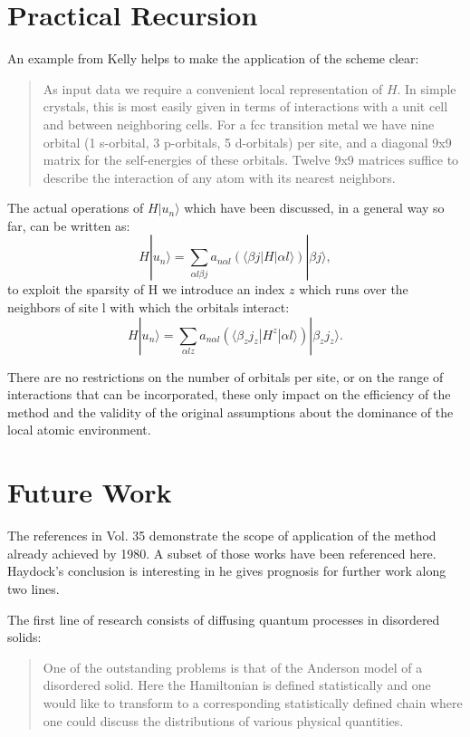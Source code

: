 \documentclass{article}
\def\ket{\rangle}
\def\bra{\langle}
\begin{document}
\section{Practical Recursion}
An example from Kelly helps to make the application of the scheme clear:
%
\begin{quote}
As input data we require a convenient local representation of $H$. In simple crystals,
this is most easily given in terms of interactions with a unit cell and between neighboring cells.
For a fcc transition metal we have nine orbital (1 s-orbital, 3 p-orbitals, 5 d-orbitals) per site, and a diagonal 9x9 matrix
for the self-energies of these orbitals. Twelve 9x9 matrices suffice to describe the interaction 
of any atom with its nearest neighbors.
\end{quote}
%

The actual operations of $H|u_{n}\ket$ which have been discussed, in a general way so far, 
can be written as:
%
\begin{equation}
H|u_{n}\ket = \sum_{\alpha l \beta j}a_{n \alpha l}(\bra \beta j |H| \alpha l\ket)|\beta j\ket,
\end{equation}
%
to exploit the sparsity of H we introduce an index $z$ which runs over the neighbors of 
site l with which the orbitals interact:
\begin{equation}
H|u_{n}\ket = \sum_{\alpha l z}a_{n \alpha l}(\bra \beta_{z} j_{z} |H^{z}|\alpha l\ket)|\beta_{z} j_{z}\ket.
\end{equation}

There are no restrictions on the number of orbitals per site, or on the range of interactions that can be
incorporated, these only impact on the efficiency of the method and the validity of the original assumptions
about the dominance of the local atomic environment.

\section{Future Work}
The references in Vol. 35 demonstrate the scope of application of the method 
already achieved by 1980. A subset of those works have been referenced here. 
Haydock's conclusion is interesting in he gives prognosis for further work
along two lines. 

The first line of research consists of diffusing quantum processes in disordered
solids:
%
\begin{quote}
One of the outstanding problems is that of the Anderson model
of a disordered solid. Here the Hamiltonian is defined statistically and
one would like to transform to a corresponding statistically defined chain where
one could discuss the distributions of various physical quantities.
\end{quote}
%
\end{document}
